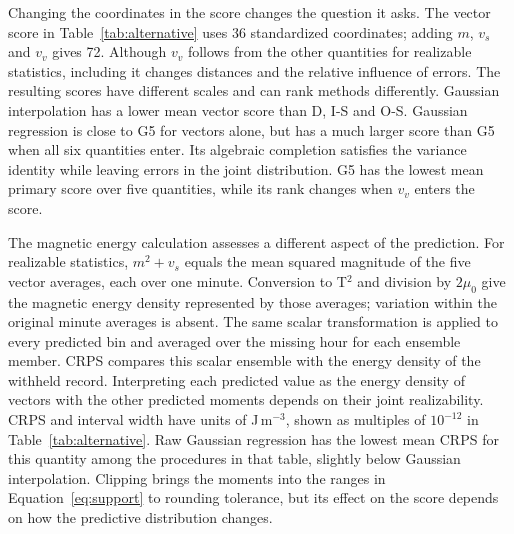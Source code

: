 \documentclass{article}
\begin{document}
\begin{samepage}
Changing the coordinates in the score changes the question it asks. The vector score in Table~\ref{tab:alternative} uses 36 standardized coordinates; adding $m$, $v_s$ and $v_v$ gives 72. Although $v_v$ follows from the other quantities for realizable statistics, including it changes distances and the relative influence of errors. The resulting scores have different scales and can rank methods differently. Gaussian interpolation has a lower mean vector score than D, I-S and O-S. Gaussian regression is close to G5 for vectors alone, but has a much larger score than G5 when all six quantities enter. Its algebraic completion satisfies the variance identity while leaving errors in the joint distribution. G5 has the lowest mean primary score over five quantities, while its rank changes when $v_v$ enters the score.

The magnetic energy calculation assesses a different aspect of the prediction. For realizable statistics, $m^2+v_s$ equals the mean squared magnitude of the five vector averages, each over one minute. Conversion to T$^2$ and division by $2\mu_0$ give the magnetic energy density represented by those averages; variation within the original minute averages is absent. The same scalar transformation is applied to every predicted bin and averaged over the missing hour for each ensemble member. CRPS compares this scalar ensemble with the energy density of the withheld record. Interpreting each predicted value as the energy density of vectors with the other predicted moments depends on their joint realizability. CRPS and interval width have units of J\,m$^{-3}$, shown as multiples of $10^{-12}$ in Table~\ref{tab:alternative}. Raw Gaussian regression has the lowest mean CRPS for this quantity among the procedures in that table, slightly below Gaussian interpolation. Clipping brings the moments into the ranges in Equation~\ref{eq:support} to rounding tolerance, but its effect on the score depends on how the predictive distribution changes.
\end{samepage}
\end{document}
